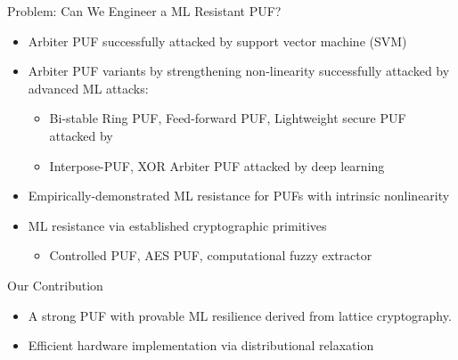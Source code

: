 \begin{frame}{Problem: Can We Engineer a ML Resistant PUF?}
\begin{itemize}
    \item Arbiter PUF successfully attacked by support vector machine (SVM)
    \item Arbiter PUF variants by strengthening non-linearity successfully attacked by advanced ML attacks:
        \begin{itemize}
            \item Bi-stable Ring PUF, Feed-forward PUF, Lightweight secure PUF attacked by
            \item Interpose-PUF, XOR Arbiter PUF attacked by deep learning
        \end{itemize}
    \item Empirically-demonstrated ML resistance for PUFs with intrinsic nonlinearity 
    \item ML resistance via established cryptographic primitives
        \begin{itemize}
            \item Controlled PUF, AES PUF, computational fuzzy extractor
        \end{itemize}
\end{itemize}    
\end{frame}

\begin{frame}{Our Contribution}
\begin{itemize}
    \item A strong PUF with provable ML resilience derived from lattice cryptography.
    \item Efficient hardware implementation via distributional relaxation
\end{itemize}    
\end{frame}

